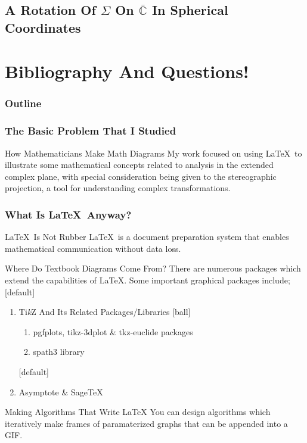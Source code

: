 \documentclass[24pt]{beamer}
\begin{document}
\subsection{A Rotation Of $\Sigma$ On $\overline{\mathbb{C}}$ In Spherical Coordinates}
\section{Bibliography And Questions!}


\begin{frame}
\frametitle{Outline}
\tableofcontents
\end{frame}


\begin{frame}
\frametitle{The Basic Problem That I Studied}
\begin{block}{How Mathematicians Make Math Diagrams}
My work focused on using \LaTeX\ to illustrate some mathematical concepts related to analysis in the extended complex plane, with special consideration being given to the stereographic projection, a tool for understanding complex transformations.
\end{block}
\end{frame}


\begin{frame}
\frametitle{What Is \LaTeX\ Anyway?}
\begin{block}{\LaTeX\ Is Not Rubber}
\LaTeX\ is a document preparation system that enables mathematical communication without data loss.
\end{block}

\begin{block}{Where Do Textbook Diagrams Come From?}
There are numerous packages which extend the capabilities of \LaTeX. Some important graphical packages include;
[default]
\begin{enumerate}
\item Ti\textit{k}Z And  Its Related Packages/Libraries
[ball]
\begin{enumerate}
\item pgfplots, tikz-3dplot \& tkz-euclide packages
\item spath3 library
\end{enumerate}
[default]
\item Asymptote \& Sage\TeX
\end{enumerate}
\end{block}

\begin{block}{Making Algorithms That Write \LaTeX}
You can design algorithms which iteratively make frames of paramaterized graphs that can be appended into a GIF.
\end{block}
\end{frame}
\end{document}
